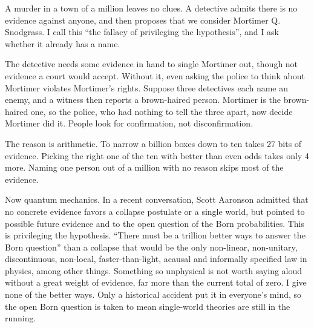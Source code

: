 
A murder in a town of a million leaves no clues. A detective admits there is no evidence against anyone, and then proposes that we consider Mortimer Q. Snodgrass. I call this ``the fallacy of privileging the hypothesis'', and I ask whether it already has a name.

The detective needs some evidence in hand to single Mortimer out, though not evidence a court would accept. Without it, even asking the police to think about Mortimer violates Mortimer's rights. Suppose three detectives each name an enemy, and a witness then reports a brown-haired person. Mortimer is the brown-haired one, so the police, who had nothing to tell the three apart, now decide Mortimer did it. People look for confirmation, not disconfirmation.

The reason is arithmetic. To narrow a billion boxes down to ten takes 27 bits of evidence. Picking the right one of the ten with better than even odds takes only 4 more.  Naming one person out of a million with no reason skips most of the evidence.

Now quantum mechanics. In a recent conversation, Scott Aaronson admitted that no concrete evidence favors a collapse postulate or a single world, but pointed to possible future evidence and to the open question of the Born probabilities. This is privileging the hypothesis. ``There must be a trillion better ways to answer the Born question'' than a collapse that would be the only non-linear, non-unitary, discontinuous, non-local, faster-than-light, acausal and informally specified law in physics, among other things. Something so unphysical is not worth saying aloud without a great weight of evidence, far more than the current total of zero. I give none of the better ways.  Only a historical accident put it in everyone's mind, so the open Born question is taken to mean single-world theories are still in the running. 

